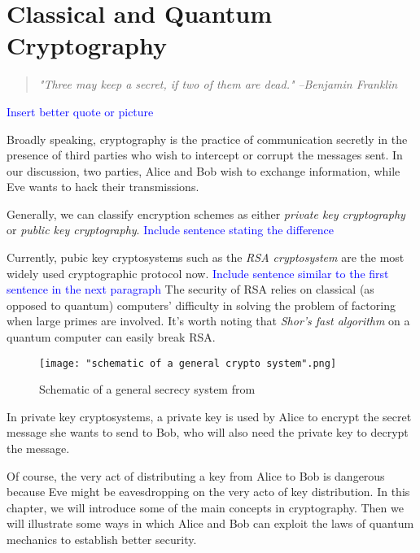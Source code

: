 
\chapter{Classical and Quantum Cryptography} %

\label{Chapter5-cryptography} %


\begin{quote}
\textit{"Three may keep a secret, if two of them are dead."} \textit{--Benjamin Franklin}
\end{quote}

\textcolor{blue}{Insert better quote or picture}



Broadly speaking, cryptography is the practice of communication secretly in the presence of third parties who wish to intercept or corrupt the messages sent. In our discussion, two parties, Alice and Bob wish to exchange information, while Eve wants to hack their transmissions.

Generally, we can classify encryption schemes as either {\emph{private key cryptography}} or {\emph{public key cryptography}}.  {\textcolor{blue}{Include sentence stating the difference}}  

Currently, pubic key cryptosystems such as the {\emph{RSA cryptosystem}} are the most widely used cryptographic protocol now.  {\textcolor{blue}{Include sentence similar to the first sentence in the next paragraph}} The security of RSA relies on classical (as opposed to quantum) computers' difficulty in solving the problem of factoring when large primes are involved. It's worth noting that {\emph{Shor's fast algorithm}} on a quantum computer can easily break RSA.

\begin{figure}[h]
    \centering
    \texttt{[image: "schematic of a general crypto system".png]}
    \caption{Schematic of a general secrecy system from \cite{shannon1949communication}}
    \label{fig:general crypto schematic}
\end{figure}

In private key cryptosystems, a private key is used by Alice to encrypt the secret message she wants to send to Bob, who will also need the private key to decrypt the message. 


Of course, the very act of distributing a key from Alice to Bob is dangerous because Eve might be eavesdropping on the very acto of key distribution. In this chapter, we will introduce some of the main concepts in cryptography.  Then we will illustrate some ways in which Alice and Bob can exploit the laws of quantum mechanics to establish better security. 


